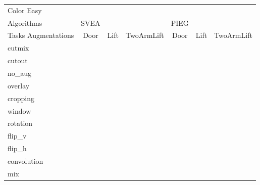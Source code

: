 \begin{tabular}{lcccccc}
Color Easy & & & & & & \\
Algorithms & SVEA & & & PIEG & & \\
Tasks Augmentations & Door & Lift & TwoArmLift & Door & Lift & TwoArmLift \\
cutmix          &  &  &  &  &  &  \\
cutout          &  &  &  &  &  &  \\
no\_aug         &  &  &  &  &  &  \\
overlay         &  &  &  &  &  &  \\
cropping        &  &  &  &  &  &  \\
window          &  &  &  &  &  &  \\
rotation        &  &  &  &  &  &  \\
flip\_v         &  &  &  &  &  &  \\
flip\_h         &  &  &  &  &  &  \\
convolution     &  &  &  &  &  &  \\
mix             &  &  &  &  &  &  \\
\end{tabular}